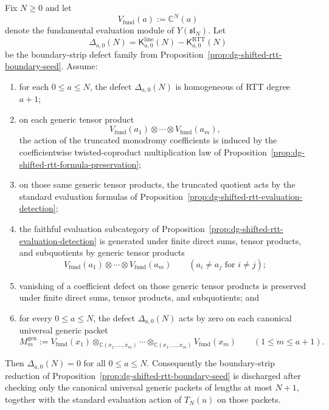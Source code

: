 \begin{proposition}
\label{prop:dg-shifted-rtt-finite-tensor-detection}
Fix $N \ge 0$ and let
\[
V_{\mathrm{fund}}(a):=\mathbb{C}^N(a)
\]
denote the fundamental evaluation module of
$Y(\mathfrak{sl}_N)$.  Let
\[
\Delta_{a,0}(N)
=\mathsf{K}^{\mathrm{line}}_{a,0}(N)
-\mathsf{K}^{\mathrm{RTT}}_{a,0}(N)
\]
be the boundary-strip defect family from
Proposition~\ref{prop:dg-shifted-rtt-boundary-seed}.  Assume:
\begin{enumerate}[label=\textup{(\roman*)}]
\item for each $0 \le a \le N$, the defect $\Delta_{a,0}(N)$ is
  homogeneous of RTT degree $a+1$;
\item on each generic tensor product
  \[
  V_{\mathrm{fund}}(a_1)\otimes\cdots\otimes
  V_{\mathrm{fund}}(a_m),
  \]
  the action of the truncated monodromy coefficients is induced by the
  coefficientwise twisted-coproduct multiplication law of
  Proposition~\ref{prop:dg-shifted-rtt-formula-preservation};
\item on those same generic tensor products, the truncated quotient
  acts by the standard evaluation formulas of
  Proposition~\ref{prop:dg-shifted-rtt-evaluation-detection};
\item the faithful evaluation subcategory of
  Proposition~\ref{prop:dg-shifted-rtt-evaluation-detection} is
  generated under finite direct sums, tensor products, and subquotients
  by generic tensor products
  \[
  V_{\mathrm{fund}}(a_1)\otimes\cdots\otimes V_{\mathrm{fund}}(a_m)
  \qquad (a_i\neq a_j \text{ for } i\neq j);
  \]
\item vanishing of a coefficient defect on those generic tensor products
  is preserved under finite direct sums, tensor products, and
  subquotients; and
\item for every $0 \le a \le N$, the defect $\Delta_{a,0}(N)$ acts by
  zero on each canonical universal generic packet
  \[
  M_m^{\mathrm{gen}}
  :=
  V_{\mathrm{fund}}(x_1)\otimes_{\mathbb{C}(x_1,\dots,x_m)}\cdots
  \otimes_{\mathbb{C}(x_1,\dots,x_m)}V_{\mathrm{fund}}(x_m)
  \qquad (1\le m\le a+1).
  \]
\end{enumerate}
Then $\Delta_{a,0}(N)=0$ for all $0 \le a \le N$.  Consequently the
boundary-strip reduction of
Proposition~\ref{prop:dg-shifted-rtt-boundary-seed} is discharged after
checking only the canonical universal generic packets of lengths at
most $N+1$, together with the standard evaluation action of $T_N(u)$ on
those packets.
\end{proposition}

